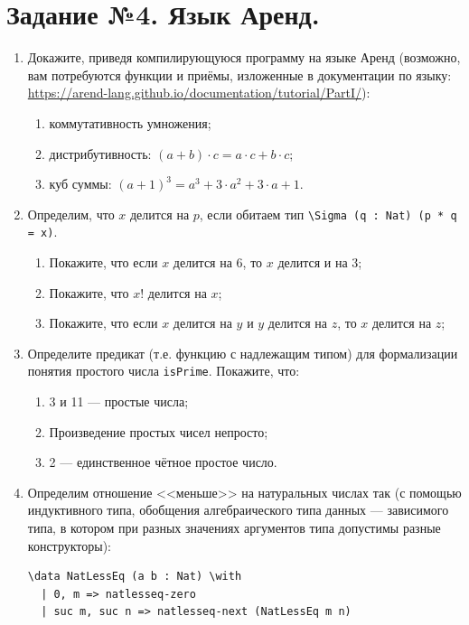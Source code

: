 \documentclass[10pt,a4paper,oneside]{article}
\begin{document}
\section*{Задание №4. Язык Аренд.}
\begin{enumerate}
\item Докажите, приведя компилирующуюся программу на языке Аренд (возможно, вам потребуются функции и приёмы, 
изложенные в документации по языку: \url{https://arend-lang.github.io/documentation/tutorial/PartI/}):
\begin{enumerate}
\item коммутативность умножения;
\item дистрибутивность: $(a + b)\cdot c = a\cdot c + b \cdot c$;
\item куб суммы: $(a + 1)^3 = a^3 + 3\cdot a^2 + 3 \cdot a + 1$.
\end{enumerate}

\item Определим, что $x$ делится на $p$, если обитаем тип \verb!\Sigma (q : Nat) (p * q = x)!.
\begin{enumerate}
\item Покажите, что если $x$ делится на 6, то $x$ делится и на 3;
\item Покажите, что $x!$ делится на $x$;
\item Покажите, что если $x$ делится на $y$ и $y$ делится на $z$, то $x$ делится на $z$;
\end{enumerate}

\item Определите предикат (т.е. функцию с надлежащим типом) для формализации понятия простого числа \verb!isPrime!.
Покажите, что:
\begin{enumerate}
\item 3 и 11 --- простые числа;
\item Произведение простых чисел непросто;
\item 2 --- единственное чётное простое число.
\end{enumerate}

\item Определим отношение <<меньше>> на натуральных числах так (с помощью индуктивного типа, обобщения алгебраического типа данных ---
зависимого типа, в котором при разных значениях аргументов типа допустимы разные конструкторы):
\begin{verbatim}
\data NatLessEq (a b : Nat) \with
  | 0, m => natlesseq-zero
  | suc m, suc n => natlesseq-next (NatLessEq m n)
\end{verbatim}


\end{enumerate}
\end{document}
